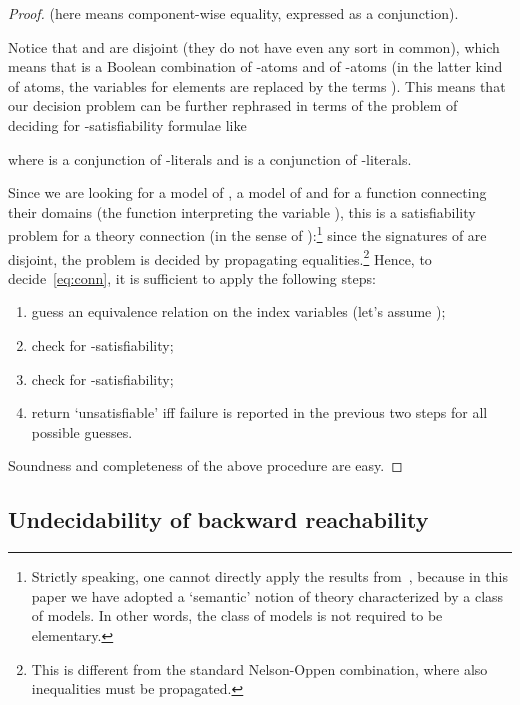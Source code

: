 \documentclass{LMCS}
\theoremstyle{plain}\newtheorem{assumption}[thm]{Assumption}
\theoremstyle{plain}\newtheorem{proposition}[thm]{Proposition}
\theoremstyle{plain}\newtheorem{property}[thm]{Property}
\theoremstyle{plain}\newtheorem{example}[thm]{Example}
\theoremstyle{plain}\newtheorem{claim}[thm]{Claim}
\theoremstyle{plain}\newtheorem{lemma}[thm]{Lemma}
\begin{document}
\begin{proof}
  (here  means component-wise equality, expressed as a
  conjunction).


  Notice that  and  are disjoint (they do not have even any
  sort in common), which means that  is a Boolean combination of -atoms and of
  -atoms (in the latter kind of atoms, the variables for
  elements are replaced by the terms ). This means
  that our decision problem can be further rephrased in terms of the
  problem of deciding for -satisfiability formulae like
  
  where  is a conjunction of -literals and
   is a conjunction of -literals.


  Since we are looking for a model of , a model of  and for
  a function connecting their domains (the function interpreting the
  variable ), this is a satisfiability problem for a theory
  connection (in the sense of \cite{BaGh}):\footnote{Strictly
    speaking, one cannot directly apply the results from~\cite{BaGh},
    because in this paper we have adopted a `semantic' notion of
    theory characterized by a class  of models.  In other
    words, the class  of models is not required to be
    elementary.} since the signatures of  are disjoint, the
  problem is decided by propagating equalities.\footnote{This is
    different from the standard Nelson-Oppen combination, where also
    inequalities must be propagated.}  Hence, to
  decide~\eqref{eq:conn}, it is sufficient to apply the following
  steps:
  \begin{enumerate}[]
  \item guess an equivalence relation  on the index variables
     (let's assume );
  \item check  for -satisfiability;
  \item check  for -satisfiability;
  \item return `unsatisfiable' iff failure is reported in the
    previous two steps for all possible guesses.
  \end{enumerate}
  Soundness and completeness of the above procedure are easy.
\end{proof}


\subsection*{Undecidability of backward reachability}
\end{document}
